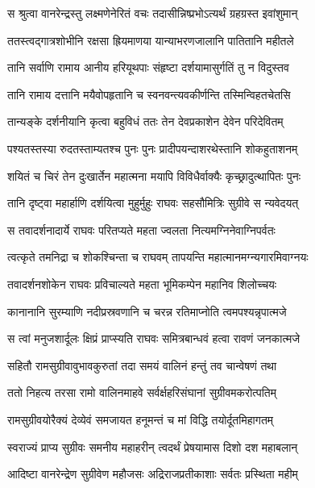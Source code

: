 \twolineshloka
{स श्रुत्वा वानरेन्द्रस्तु लक्ष्मणेनेरितं वचः}
{तदासीन्निष्प्रभोऽत्यर्थं ग्रहग्रस्त इवांशुमान्} %

\twolineshloka
{ततस्त्वद्गात्रशोभीनि रक्षसा ह्रियमाणया}
{यान्याभरणजालानि पातितानि महीतले} %

\twolineshloka
{तानि सर्वाणि रामाय आनीय हरियूथपाः}
{संहृष्टा दर्शयामासुर्गतिं तु न विदुस्तव} %

\twolineshloka
{तानि रामाय दत्तानि मयैवोपहृतानि च}
{स्वनवन्त्यवकीर्णन्ति तस्मिन्विहतचेतसि} %

\twolineshloka
{तान्यङ्के दर्शनीयानि कृत्वा बहुविधं ततः}
{तेन देवप्रकाशेन देवेन परिदेवितम्} %

\twolineshloka
{पश्यतस्तस्या रुदतस्ताम्यतश्च पुनः पुनः}
{प्रादीपयन्दाशरथेस्तानि शोकहुताशनम्} %

\twolineshloka
{शयितं च चिरं तेन दुःखार्तेन महात्मना}
{मयापि विविधैर्वाक्यैः कृच्छ्रादुत्थापितः पुनः} %

\twolineshloka
{तानि दृष्ट्वा महार्हाणि दर्शयित्वा मुहुर्मुहुः}
{राघवः सहसौमित्रिः सुग्रीवे स न्यवेदयत्} %

\twolineshloka
{स तवादर्शनादार्ये राघवः परितप्यते}
{महता ज्वलता नित्यमग्निनेवाग्निपर्वतः} %

\twolineshloka
{त्वत्कृते तमनिद्रा च शोकश्चिन्ता च राघवम्}
{तापयन्ति महात्मानमग्न्यगारमिवाग्नयः} %

\twolineshloka
{तवादर्शनशोकेन राघवः प्रविचाल्यते}
{महता भूमिकम्पेन महानिव शिलोच्चयः} %

\twolineshloka
{कानानानि सुरम्याणि नदीप्रस्रवणानि च}
{चरन्न रतिमाप्नोति त्वमपश्यन्नृपात्मजे} %

\twolineshloka
{स त्वां मनुजशार्दूलः क्षिप्रं प्राप्स्यति राघवः}
{समित्रबान्धवं हत्वा रावणं जनकात्मजे} %

\twolineshloka
{सहितौ रामसुग्रीवावुभावकुरुतां तदा}
{समयं वालिनं हन्तुं तव चान्वेषणं तथा} %

\twolineshloka
{ततो निहत्य तरसा रामो वालिनमाहवे}
{सर्वर्क्षहरिसंघानां सुग्रीवमकरोत्पतिम्} %

\twolineshloka
{रामसुग्रीवयोरैक्यं देव्येवं समजायत}
{हनूमन्तं च मां विद्धि तयोर्दूतमिहागतम्} %

\twolineshloka
{स्वराज्यं प्राप्य सुग्रीवः समनीय महाहरीन्}
{त्वदर्थं प्रेषयामास दिशो दश महाबलान्} %

\twolineshloka
{आदिष्टा वानरेन्द्रेण सुग्रीवेण महौजसः}
{अद्रिराजप्रतीकाशाः सर्वतः प्रस्थिता महीम्} %

